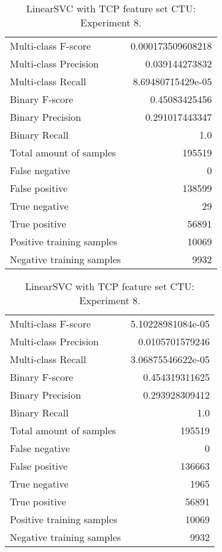 \begin{table}[H]
\begin{minipage}{0.5\textwidth}
\caption{LinearSVC with TCP feature set CTU: Experiment 7.}
\centering
\begin{tabular}{l r}
\toprule
Multi-class F-score & 0.000173509608218 \\
Multi-class Precision & 0.039144273832 \\
Multi-class Recall & 8.69480715429e-05 \\
\midrule
Binary F-score & 0.45083425456 \\
Binary Precision & 0.291017443347 \\
Binary Recall & 1.0 \\
\midrule
Total amount of samples & 195519 \\
False negative & 0 \\
False positive & 138599 \\
True negative & 29 \\
True positive & 56891 \\
\midrule
Positive training samples & 10069 \\
Negative training samples & 9932 \\
\bottomrule
\end{tabular}
\end{minipage}
\hfillx
\begin{minipage}{0.5\textwidth}
\caption{LinearSVC with TCP feature set CTU: Experiment 8.}
\centering
\begin{tabular}{l r}
\toprule
Multi-class F-score & 5.10228981084e-05 \\
Multi-class Precision & 0.0105701579246 \\
Multi-class Recall & 3.06875546622e-05 \\
\midrule
Binary F-score & 0.454319311625 \\
Binary Precision & 0.293928309412 \\
Binary Recall & 1.0 \\
\midrule
Total amount of samples & 195519 \\
False negative & 0 \\
False positive & 136663 \\
True negative & 1965 \\
True positive & 56891 \\
\midrule
Positive training samples & 10069 \\
Negative training samples & 9932 \\
\bottomrule
\end{tabular}
\end{minipage}
\end{table}
